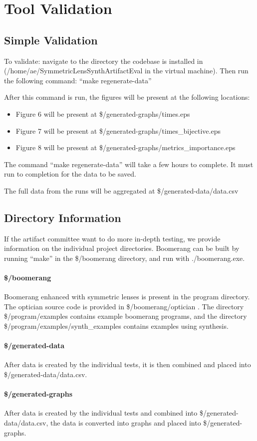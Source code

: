 \documentclass[sigplan,acmsmall]{acmart}
\begin{document}
\section{Tool Validation}

\subsection{Simple Validation}

To validate: navigate to the directory the codebase is installed in
(/home/ae/SymmetricLensSynthArtifactEval in the virtual machine).
Then run the following command: ``make regenerate-data''

After this command is run, the figures will be present at the following
locations: 
\begin{itemize}
\item Figure 6 will be present at \$/generated-graphs/times.eps
\item Figure 7 will be present at \$/generated-graphs/times\_bijective.eps
\item Figure 8 will be present at \$/generated-graphs/metrics\_importance.eps
\end{itemize}

The command ``make regenerate-data'' will take a few hours to complete. It
must run to completion for the data to be saved.

The full data from the runs will be aggregated at
\$/generated-data/data.csv

\subsection{Directory Information}

If the artifact committee want to do more in-depth testing, we provide
information on the individual project directories. Boomerang can be built by
running ``make'' in the \$/boomerang directory, and run with ./boomerang.exe.

\paragraph*{\$/boomerang} Boomerang enhanced with symmetric lenses is present in
the program directory. The optician source code is provided in
\$/boomerang/optician . The directory \$/program/examples contains example
boomerang programs, and the directory \$/program/examples/synth\_examples
contains examples using synthesis.

\paragraph*{\$/generated-data} After data is created by the individual tests, it
is then combined and placed into \$/generated-data/data.csv.

\paragraph*{\$/generated-graphs} After data is created by the individual tests
and combined into \$/generated-data/data.csv, the data is converted into graphs
and placed into \$/generated-graphs.
\end{document}

